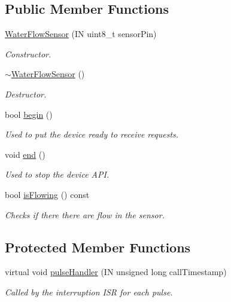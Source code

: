 \subsection*{Public Member Functions}
\begin{DoxyCompactItemize}
\item 
\hyperlink{class_easyuino_1_1_water_flow_sensor_acee82d1863cb2311e58210906d9fbfaa}{Water\+Flow\+Sensor} (IN uint8\+\_\+t sensor\+Pin)
\begin{DoxyCompactList}\small\item\em Constructor. \end{DoxyCompactList}\item 
\mbox{\label{class_easyuino_1_1_water_flow_sensor_aad4212e3ee97251787a78db46bdfb803}} 
\hyperlink{class_easyuino_1_1_water_flow_sensor_aad4212e3ee97251787a78db46bdfb803}{$\sim$\+Water\+Flow\+Sensor} ()
\begin{DoxyCompactList}\small\item\em Destructor. \end{DoxyCompactList}\item 
bool \hyperlink{class_easyuino_1_1_water_flow_sensor_a55dcab6c527b1e1951a1fff69efdb763}{begin} ()
\begin{DoxyCompactList}\small\item\em Used to put the device ready to receive requests. \end{DoxyCompactList}\item 
void \hyperlink{class_easyuino_1_1_water_flow_sensor_a7f31ac7735b049394d34cfbc37f17359}{end} ()
\begin{DoxyCompactList}\small\item\em Used to stop the device A\+PI. \end{DoxyCompactList}\item 
bool \hyperlink{class_easyuino_1_1_water_flow_sensor_a67678648c16c24f773e134bb0d2b0df8}{is\+Flowing} () const
\begin{DoxyCompactList}\small\item\em Checks if there there are flow in the sensor. \end{DoxyCompactList}\end{DoxyCompactItemize}
\subsection*{Protected Member Functions}
\begin{DoxyCompactItemize}
\item 
virtual void \hyperlink{class_easyuino_1_1_water_flow_sensor_ab359b33262e324fa757de05a13f05141}{pulse\+Handler} (IN unsigned long call\+Timestamp)
\begin{DoxyCompactList}\small\item\em Called by the interruption I\+SR for each pulse. \end{DoxyCompactList}\end{DoxyCompactItemize}
